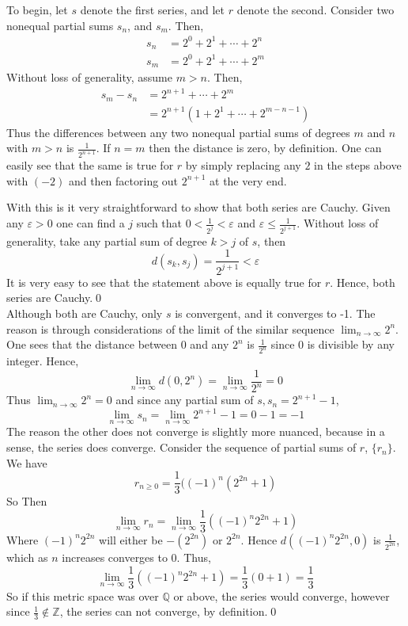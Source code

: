 \documentclass[12pt, letterpaper]{article}
\begin{document}
\noindent To begin, let $s$ denote the first series, and let $r$ denote the second. Consider two nonequal partial sums $s_n$, and $s_m$. Then,
\begin{align*}
  s_n &= 2^0 + 2^1 + \cdots + 2^n \\
  s_m &= 2^0 + 2^1 + \cdots + 2^m
\end{align*}
Without loss of generality, assume $m > n$. Then,
\begin{align*}
  s_m - s_n &= 2^{n + 1} + \cdots + 2^m \\
  &= 2^{n + 1}(1 + 2^1 + \cdots + 2^{m - n - 1})
\end{align*}
Thus the differences between any two nonequal partial sums of degrees $m$ and $n$ with $m > n$ is $\frac{1}{2^{n+1}}$. If $n = m$ then the distance is zero, by definition.
One can easily see that the same is true for $r$ by simply replacing any $2$ in the steps above with $(-2)$ and then factoring out $2^{n+1}$ at the very end.
\par With this is it very straightforward to show that both series are
Cauchy. Given any $\varepsilon > 0$ one can find a $j$ such that $0 < \frac{1}{2^j} < \varepsilon$ and $\varepsilon \leq \frac{1}{2^{j + 1}}$.
Without loss of generality, take any partial sum of degree $k > j$ of $s$, then
$$d(s_k, s_j) = \frac{1}{2^{j + 1}} < \varepsilon$$
It is very easy to see that the statement above is equally true for $r$. Hence, both series are Cauchy.\qed\\

\noindent Although both are Cauchy, only $s$ is convergent, and it converges to -1. The reason is through considerations of the limit of the similar sequence $\lim_{n\to\infty} 2^n$.
One sees that the distance between 0 and any $2^n$ is $\frac{1}{2^n}$ since 0 is divisible by any integer. Hence,
$$ \lim_{n\to\infty} d(0, 2^n) = \lim_{n\to\infty} \frac{1}{2^n} = 0$$
Thus $\lim_{n\to\infty} 2^n = 0$ and since any partial sum of $s, s_n = 2^{n+1} - 1$,
$$\lim_{n\to\infty} s_n = \lim_{n\to\infty} 2^{n + 1} - 1 = 0 - 1 = -1$$
The reason the other does not converge is slightly more nuanced, because in a sense, the series does converge. Consider the sequence of partial sums of $r$, $\{r_n\}$. We have
$$ r_{n\geq0} = \frac{1}{3}((-1)^n(2^{2n} + 1) $$
So Then
$$ \lim_{n\to\infty} r_n = \lim_{n\to\infty} \frac{1}{3}((-1)^n2^{2n} + 1) $$
Where $(-1)^n2^{2n}$ will either be $-(2^{2n})$ or $2^{2n}$. Hence $d((-1)^n2^{2n}, 0)$ is $\frac{1}{2^{2n}}$, which as $n$ increases converges to 0. Thus,
$$ \lim_{n\to\infty} \frac{1}{3}((-1)^n2^{2n} + 1) = \frac{1}{3}(0 + 1) = \frac{1}{3}$$
So if this metric space was over $\mathbb{Q}$ or above, the series would converge, however since $\frac{1}{3} \notin \mathbb{Z}$, the series can not converge, by definition.\qed
\pagebreak
\end{document}
